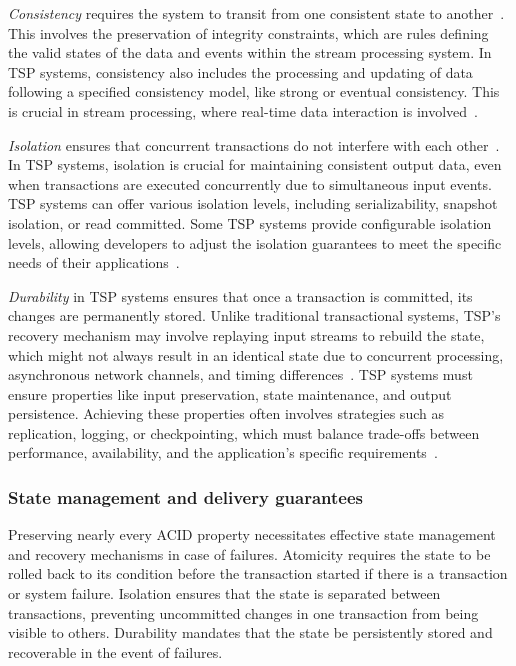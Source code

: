 {\em Consistency} requires the system to transit from one consistent state to another~\cite{zhang2024survey}. This involves the preservation of integrity constraints, which are rules defining the valid states of the data and events within the stream processing system. In TSP systems, consistency also includes the processing and updating of data following a specified consistency model, like strong or eventual consistency. This is crucial in stream processing, where real-time data interaction is involved~\cite{affetti2017flowdb, zhang2020towards}.

{\em Isolation} ensures that concurrent transactions do not interfere with each other~\cite{zhang2024survey}. In TSP systems, isolation is crucial for maintaining consistent output data, even when transactions are executed concurrently due to simultaneous input events. TSP systems can offer various isolation levels, including serializability, snapshot isolation, or read committed. Some TSP systems provide configurable isolation levels, allowing developers to adjust the isolation guarantees to meet the specific needs of their applications~\cite{affetti2017flowdb}.

{\em Durability} in TSP systems ensures that once a transaction is committed, its changes are permanently stored. Unlike traditional transactional systems, TSP's recovery mechanism may involve replaying input streams to rebuild the state, which might not always result in an identical state due to concurrent processing, asynchronous network channels, and timing differences~\cite{thepaper}. TSP systems must ensure properties like input preservation, state maintenance, and output persistence. Achieving these properties often involves strategies such as replication, logging, or checkpointing, which must balance trade-offs between performance, availability, and the application's specific requirements~\cite{zhang2024survey}.

\subsubsection{State management and delivery guarantees}

Preserving nearly every ACID property necessitates effective state management and recovery mechanisms in case of failures. Atomicity requires the state to be rolled back to its condition before the transaction started if there is a transaction or system failure. Isolation ensures that the state is separated between transactions, preventing uncommitted changes in one transaction from being visible to others. Durability mandates that the state be persistently stored and recoverable in the event of failures.

